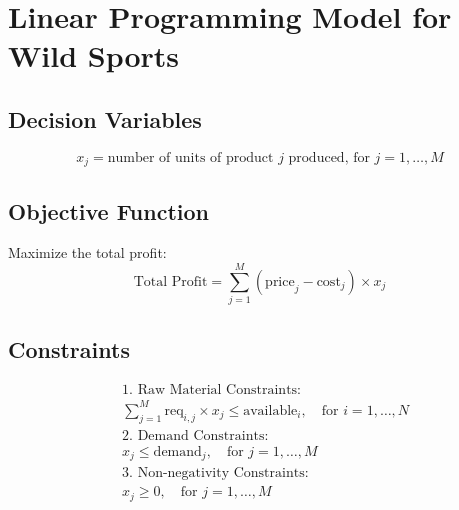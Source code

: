 \documentclass{article}
\begin{document}
\section*{Linear Programming Model for Wild Sports}

\subsection*{Decision Variables}
\[
x_j = \text{number of units of product } j \text{ produced, for } j = 1, \ldots, M
\]

\subsection*{Objective Function}
Maximize the total profit:
\[
\text{Total Profit} = \sum_{j=1}^{M} (\text{price}_j - \text{cost}_j) \times x_j
\]

\subsection*{Constraints}
\begin{align*}
&\text{1. Raw Material Constraints:}\\
&\sum_{j=1}^{M} \text{req}_{i,j} \times x_j \leq \text{available}_i, \quad \text{for } i = 1, \ldots, N\\
&\text{2. Demand Constraints:}\\
&x_j \leq \text{demand}_j, \quad \text{for } j = 1, \ldots, M\\
&\text{3. Non-negativity Constraints:}\\
&x_j \geq 0, \quad \text{for } j = 1, \ldots, M
\end{align*}
\end{document}
